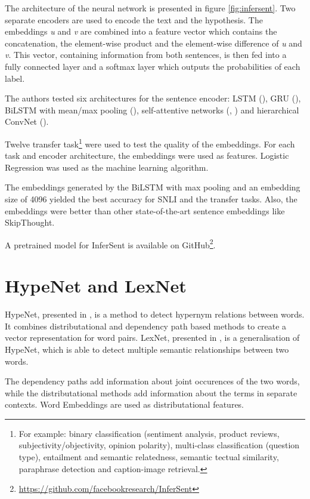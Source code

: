 The architecture of the neural network is presented in figure \ref{fig:infersent}. Two separate encoders are used to encode the text and the hypothesis. The embeddings \emph{u} and \emph{v} are combined into a feature vector which contains the concatenation, the element-wise product and the element-wise difference of \emph{u} and \emph{v}. This vector, containing information from both sentences, is then fed into a fully connected layer and a softmax layer which outputs the probabilities of each label.

The authors tested six architectures for the sentence encoder: LSTM (\cite{hochreiter1997long}), GRU (\cite{cho2014properties}), BiLSTM with mean/max pooling (\cite{collobert2008unified}), self-attentive networks (\cite{liu2016learning}, \cite{lin2017structured}) and hierarchical ConvNet (\cite{zhao2015self}). 

Twelve transfer task\footnote{For example: binary classification (sentiment analysis, product reviews, subjectivity/objectivity, opinion polarity), multi-class classification (question type), entailment and semantic relatedness, semantic tectual similarity, paraphrase detection and caption-image retrieval.} were used to test the quality of the embeddings. For each task and encoder architecture, the embeddings were used as features. Logistic Regression was used as the machine learning algorithm.

The embeddings generated by the BiLSTM with max pooling and an embedding size of 4096 yielded the best accuracy for SNLI and the transfer tasks. Also, the embeddings were better than other state-of-the-art sentence embeddings like SkipThought.

A pretrained model for InferSent is available on GitHub\footnote{\url{https://github.com/facebookresearch/InferSent}}.

\section{HypeNet and LexNet}
\label{sec:lexnet}
HypeNet, presented in \cite{DBLP:conf/acl/ShwartzGD16}, is a method to detect hypernym relations between words. It combines distributational and dependency path based methods to create a vector representation for word pairs. LexNet, presented in \cite{DBLP:journals/corr/ShwartzD16}, is a generalisation of HypeNet, which is able to detect multiple semantic relationships between two words.

The dependency paths add information about joint occurences of the two words, while the distributational methods add information about the terms in separate contexts. Word Embeddings are used as distributational features.

